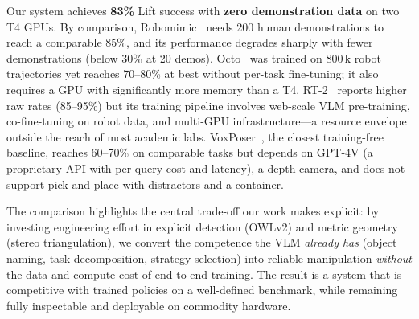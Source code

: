 \documentclass[conference]{IEEEtran}
\begin{document}
Our system achieves \textbf{83\%} Lift success with \textbf{zero demonstration data} on two T4 GPUs. By comparison, Robomimic~\cite{robomimic} needs 200 human demonstrations to reach a comparable 85\%, and its performance degrades sharply with fewer demonstrations (below 30\% at 20 demos). Octo~\cite{octo} was trained on 800\,k robot trajectories yet reaches 70--80\% at best without per-task fine-tuning; it also requires a GPU with significantly more memory than a T4. RT-2~\cite{rt2} reports higher raw rates (85--95\%) but its training pipeline involves web-scale VLM pre-training, co-fine-tuning on robot data, and multi-GPU infrastructure---a resource envelope outside the reach of most academic labs. VoxPoser~\cite{voxposer}, the closest training-free baseline, reaches 60--70\% on comparable tasks but depends on GPT-4V (a proprietary API with per-query cost and latency), a depth camera, and does not support pick-and-place with distractors and a container.

The comparison highlights the central trade-off our work makes explicit: by investing engineering effort in explicit detection (OWLv2) and metric geometry (stereo triangulation), we convert the competence the VLM \emph{already has} (object naming, task decomposition, strategy selection) into reliable manipulation \emph{without} the data and compute cost of end-to-end training. The result is a system that is competitive with trained policies on a well-defined benchmark, while remaining fully inspectable and deployable on commodity hardware.
\end{document}
